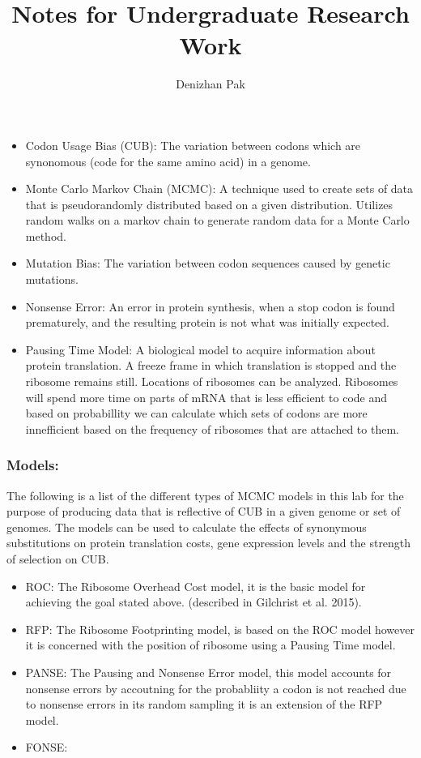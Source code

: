 \documentclass[12pt,hyperref]{labbook}
\title{Notes for Undergraduate Research Work}
\author{Denizhan Pak}
\begin{document}
\maketitle
\newpage
\tableofcontents
\newpage




\begin{itemize} 
	\item Codon Usage Bias (CUB): The variation between codons which are synonomous (code for the same amino acid) in a genome.
	\item Monte Carlo Markov Chain (MCMC): A technique used to create sets of data that is pseudorandomly distributed based on a given distribution. Utilizes random walks on a markov chain to generate random data for a Monte Carlo method.
	\item Mutation Bias: The variation between codon sequences caused by genetic mutations.
	\item Nonsense Error: An error in protein synthesis, when a stop codon is found prematurely, and the resulting protein is not what was initially expected.
	\item Pausing Time Model: A biological model to acquire information about protein translation. A freeze frame in which translation is stopped and the ribosome remains still. Locations of ribosomes can be analyzed. Ribosomes will spend more time on parts of mRNA that is less efficient to code and based on probabillity we can calculate which sets of codons are more innefficient based on the frequency of ribosomes that are attached to them.
\end{itemize}


\subsubsection{Models:}
The following is a list of the different types of MCMC models in this lab for the purpose of producing data that is reflective of CUB in a given genome or set of genomes. The models can be used to calculate the effects of synonymous substitutions on protein translation costs, gene expression levels and the strength of selection on CUB.
\begin{itemize}
	\item ROC: The Ribosome Overhead Cost model, it is the basic model for achieving the goal stated above. (described in Gilchrist et al. 2015).
	\item RFP: The Ribosome Footprinting model, is based on the ROC model however it is concerned with the position of ribosome using a Pausing Time model.
	\item PANSE: The Pausing and Nonsense Error model, this model accounts for nonsense errors by accoutning for the probabliity a codon is not reached due to nonsense errors in its random sampling it is an extension of the RFP model.
	\item FONSE: 
\end{itemize}
\end{document}
